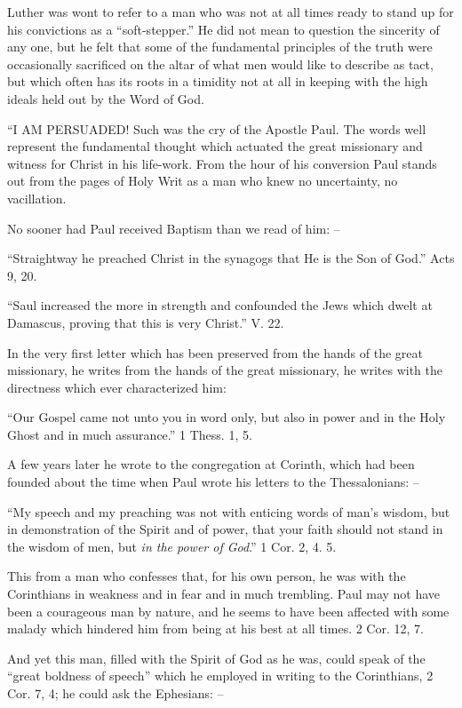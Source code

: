 \documentclass[
]{book}
\begin{document}
Luther was wont to refer to a man who was not at all times ready to stand up for his convictions as a ``soft-stepper.'' He did not mean to question the sincerity of any one, but he felt that some of the fundamental principles of the truth were occasionally sacrificed on the altar of what men would like to describe as tact, but which often has its roots in a timidity not at all in keeping with the high ideals held out by the Word of God.

``I AM PERSUADED! Such was the cry of the Apostle Paul. The words well represent the fundamental thought which actuated the great missionary and witness for Christ in his life-work. From the hour of his conversion Paul stands out from the pages of Holy Writ as a man who knew no uncertainty, no vacillation.

No sooner had Paul received Baptism than we read of him: --

``Straightway he preached Christ in the synagogs that He is the Son of God.'' Acts 9, 20.

``Saul increased the more in strength and confounded the Jews which dwelt at Damascus, proving that this is very Christ.'' V. 22.

In the very first letter which has been preserved from the hands of the great missionary, he writes from the hands of the great missionary, he writes with the directness which ever characterized him:

``Our Gospel came not unto you in word only, but also in power and in the Holy Ghost and in much assurance.'' 1 Thess. 1, 5.

A few years later he wrote to the congregation at Corinth, which had been founded about the time when Paul wrote his letters to the Thessalonians: --

``My speech and my preaching was not with enticing words of man's wisdom, but in demonstration of the Spirit and of power, that your faith should not stand in the wisdom of men, but \emph{in the power of God}.'' 1 Cor. 2, 4. 5.

This from a man who confesses that, for his own person, he was with the Corinthians in weakness and in fear and in much trembling. Paul may not have been a courageous man by nature, and he seems to have been affected with some malady which hindered him from being at his best at all times. 2 Cor. 12, 7.

And yet this man, filled with the Spirit of God as he was, could speak of the ``great boldness of speech'' which he employed in writing to the Corinthians, 2 Cor. 7, 4; he could ask the Ephesians: --
\end{document}
